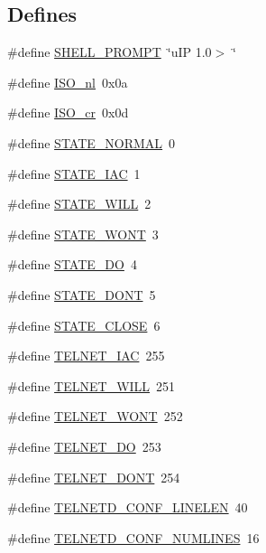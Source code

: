 \subsection*{Defines}
\begin{DoxyCompactItemize}
\item 
\#define \hyperlink{group__telnetd_gaaa60ca995565b799bb958c806e933665}{SHELL\_\-PROMPT}~\char`\"{}uIP 1.0$>$ \char`\"{}
\item 
\#define \hyperlink{group__telnetd_ga3212e70c55244608ac16316888c354f0}{ISO\_\-nl}~0x0a
\item 
\#define \hyperlink{group__telnetd_ga6cda47c85ce1b58b501b44ac9cccc50e}{ISO\_\-cr}~0x0d
\item 
\#define \hyperlink{group__telnetd_gae429c985be88ed048f382511c9ff00de}{STATE\_\-NORMAL}~0
\item 
\#define \hyperlink{group__telnetd_ga19709735f29dafeabb91e0882231f9f1}{STATE\_\-IAC}~1
\item 
\#define \hyperlink{group__telnetd_ga7e904ab59f7ee134cf3218a8219e7e29}{STATE\_\-WILL}~2
\item 
\#define \hyperlink{group__telnetd_ga5025948dd998f65a13a375a37aa5edf5}{STATE\_\-WONT}~3
\item 
\#define \hyperlink{group__telnetd_gabfc1d8d15852318927cda30e1bc0470a}{STATE\_\-DO}~4
\item 
\#define \hyperlink{group__telnetd_gaaaaaf66ea67900c36d01136d5bad1168}{STATE\_\-DONT}~5
\item 
\#define \hyperlink{group__telnetd_ga57aca709a33690cd4fb73fe199fa1bdd}{STATE\_\-CLOSE}~6
\item 
\#define \hyperlink{group__telnetd_ga8b600918f84783490fd791ce773175ab}{TELNET\_\-IAC}~255
\item 
\#define \hyperlink{group__telnetd_ga6b2d00412304e2d95e7b853cce5858b0}{TELNET\_\-WILL}~251
\item 
\#define \hyperlink{group__telnetd_ga3318dec654781e9d6d8ec873636660c6}{TELNET\_\-WONT}~252
\item 
\#define \hyperlink{group__telnetd_gaf784a76fe619452eddf87e6376a4bf9d}{TELNET\_\-DO}~253
\item 
\#define \hyperlink{group__telnetd_ga3a4852e2372e34e1c0142d1147fbe027}{TELNET\_\-DONT}~254
\item 
\#define \hyperlink{group__telnetd_ga26440a35353cb457747a4cea372c62e9}{TELNETD\_\-CONF\_\-LINELEN}~40
\item 
\#define \hyperlink{group__telnetd_ga30fe27cba3c14ae7f9a7f118144af43a}{TELNETD\_\-CONF\_\-NUMLINES}~16
\end{DoxyCompactItemize}
